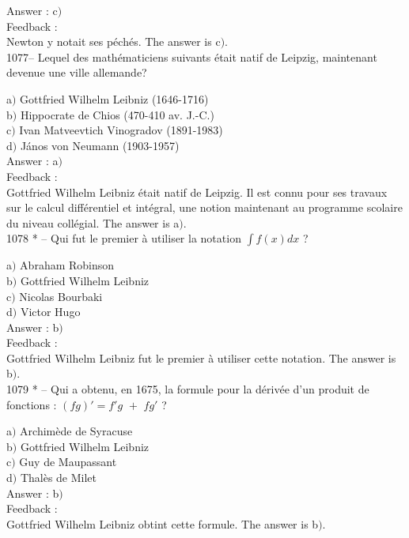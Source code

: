 ﻿\documentclass[letterpaper, 12pt]{article}
\begin{document}
Answer : c$)$\\

Feedback : \\
Newton y notait ses p\'ech\'es.
The answer is c$)$.\\

1077-- Lequel des math\'ematiciens suivants \'etait natif de
Leipzig, maintenant devenue une ville allemande?

a$)$ Gottfried Wilhelm Leibniz (1646-1716) \\
b$)$ Hippocrate de Chios (470-410 av. J.-C.) \\
c$)$ Ivan Matveevtich Vinogradov (1891-1983) \\
d$)$ J\'anos von Neumann (1903-1957) \\

Answer : a$)$\\

Feedback : \\
Gottfried Wilhelm Leibniz \'etait natif de Leipzig. Il est connu
pour ses travaux sur le calcul diff\'erentiel et int\'egral, une
notion maintenant au programme scolaire du niveau coll\'egial.
The answer is a$)$.\\

1078 * -- Qui fut le premier \`a utiliser la notation $\int f(x)dx$ ?

a$)$ Abraham Robinson \\
b$)$ Gottfried Wilhelm Leibniz \\
c$)$ Nicolas Bourbaki \\
d$)$ Victor Hugo\\

Answer : b$)$\\

Feedback : \\
Gottfried Wilhelm Leibniz fut le premier \`a utiliser cette
notation.
The answer is b$)$.\\

1079 * -- Qui a obtenu, en 1675, la formule pour la d\'eriv\'ee d'un
produit de fonctions : $(fg)'=f'g\,\,+\,\,fg'$ ?

a$)$ Archim\`ede de Syracuse \\
b$)$ Gottfried Wilhelm Leibniz \\
c$)$ Guy de Maupassant \\
d$)$ Thal\`es de Milet\\

Answer : b$)$\\

Feedback : \\
Gottfried Wilhelm Leibniz obtint cette formule.
The answer is b$)$.\\
\end{document}
